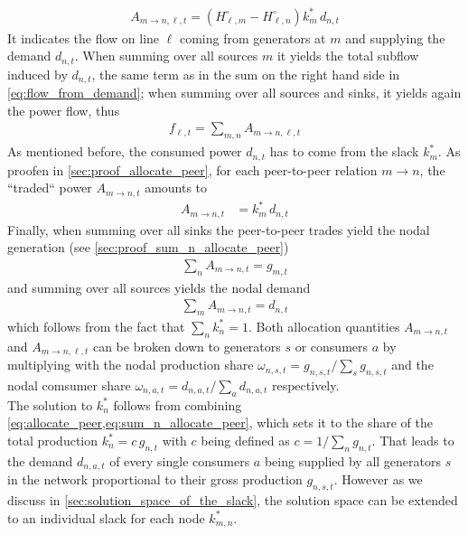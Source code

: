 \documentclass[11pt,twocolumn]{article}
\newcommand{\generation}[1][n]{g_{#1,s,t}}
\newcommand{\generationshare}[1][n]{\omega_{#1,s,t}}
\newcommand{\nodalgeneration}[1][n]{g_{#1,t}}
\newcommand{\demand}[1][n]{d_{#1,a,t}}
\newcommand{\nodaldemand}[1][n]{d_{#1,t}}
\newcommand{\demandshare}[1][n]{\omega_{#1,a,t}}
\newcommand{\ptdf}[1][n]{H_{\ell,#1}}
\newcommand{\ptdfEqual}[1][n]{\ptdf[#1]^\circ}
\newcommand{\slackk}[1][n]{k^*_{#1}}
\newcommand{\Slackk}{k^*_{m,n}}
\newcommand{\flow}{f_{\ell,t}}
\newcommand{\allocatePeer}[1][m \rightarrow n]{A_{#1,t}}
\newcommand{\allocateTransaction}[1][m \rightarrow n]{A_{#1,\ell,t}}
\begin{document}
\begin{align}
 \allocateTransaction = \left(  \ptdfEqual[m] - \ptdfEqual \right) \slackk[m] \, \nodaldemand
 \label{eq:allocate_transaction}
\end{align}
% 
It indicates the flow on line $\ell$ coming from generators at $m$ and supplying the demand $\nodaldemand$. When summing over all sources $m$ it yields the total subflow induced by $\nodaldemand$, the same term as in the sum on the right hand side in \cref{eq:flow_from_demand}; 
when summing over all sources and sinks, it yields again the power flow, thus
\begin{align}
\flow = \sum_{m,n} \allocateTransaction
\label{eq:transaction_sum}
\end{align}
% 
As mentioned before, the consumed power $\nodaldemand$ has to come from the slack $\slackk[m]$. As proofen in \cref{sec:proof_allocate_peer}, for each peer-to-peer relation $m \rightarrow n$, the ``traded`` power $\allocatePeer$  amounts to
\begin{align}
 \allocatePeer &= \slackk[m] \, \nodaldemand 
\label{eq:allocate_peer}
\end{align}
% 
Finally, when summing over all sinks the peer-to-peer trades yield the nodal generation (see \cref{sec:proof_sum_n_allocate_peer}) 
\begin{align}
 \sum_n \allocatePeer = \nodalgeneration[m]
 \label{eq:sum_n_allocate_peer}
\end{align}
and summing over all sources yields the nodal demand 
\begin{align}
 \sum_m \allocatePeer = \nodaldemand
 \label{eq:sum_m_allocate_peer}
\end{align}
which follows from the fact that $\sum_n \slackk = 1$.
Both allocation quantities $\allocatePeer$ and $\allocateTransaction$ can be broken down to generators $s$ or consumers $a$ by multiplying with the nodal production share $\generationshare = \generation/\sum_s \generation$ and the nodal comsumer share $\demandshare = \demand/\sum_a \demand$ respectively. \\


The solution to $\slackk$ follows from combining \cref{eq:allocate_peer,eq:sum_n_allocate_peer}, which sets it to the share of the total production $\slackk = c \, \nodalgeneration$ with $c$ being defined as $c = 1/\sum_n \nodalgeneration$. That leads to the demand $\demand$ of every single consumers $a$ being supplied by all generators $s$ in the network proportional to their gross production $\generation$. However as we discuss in \cref{sec:solution_space_of_the_slack}, the solution space can be extended to an individual slack for each node $\Slackk$.
\end{document}
